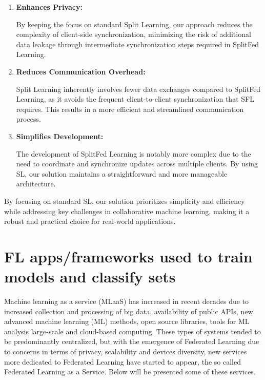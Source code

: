 \begin{enumerate}
	\item \textbf{Enhances Privacy: }
	
	By keeping the focus on standard Split Learning, our approach reduces the complexity of client-side synchronization, minimizing the risk of additional data leakage through intermediate synchronization steps required in SplitFed Learning.
	
	\item \textbf{Reduces Communication Overhead:}
	
	Split Learning inherently involves fewer data exchanges compared to SplitFed Learning, as it avoids the frequent client-to-client synchronization that \gls{SFL} requires. This results in a more efficient and streamlined communication process.

	\item \textbf{Simplifies Development:} 
	
	The development of SplitFed Learning is notably more complex due to the need to coordinate and synchronize updates across multiple clients. By using SL, our solution maintains a straightforward and more manageable architecture.
	
\end{enumerate}

By focusing on standard \gls{SL}, our solution prioritizes simplicity and efficiency while addressing key challenges in collaborative machine learning, making it a robust and practical choice for real-world applications.



\section{FL apps/frameworks used to train models and classify sets}
\label{sec:fl_apps_and_frameworks}

Machine learning as a service (MLaaS) has increased in recent decades due to increased collection and processing of big data, availability of public APIs, new advanced machine learning (\gls{ML}) methods, open source libraries, tools for \gls{ML} analysis large-scale and cloud-based computing. These types of systems tended to be predominantly centralized, but with the emergence of Federated Learning due to concerns in terms of privacy, scalability and devices diversity, new services more dedicated to Federated Learning have started to appear, the so called Federated Learning as a Service. Below will be presented some of these services.

